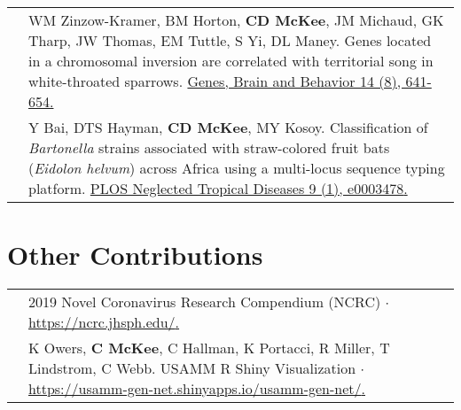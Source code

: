 \documentclass[letterpaper]{deedy-resume} %
\begin{document}
\begin{tabular}{>{\raggedright\arraybackslash}p{2cm}p{16cm}}
2015 & WM Zinzow-Kramer, BM Horton, \textbf{CD McKee}, JM Michaud, GK Tharp, JW Thomas, EM Tuttle, S Yi, DL Maney. Genes located in a chromosomal inversion are correlated with territorial song in white-throated sparrows. \href{https://doi.org/10.1111/gbb.12252}{\textcolor{special}{Genes, Brain and Behavior 14 (8), 641-654}.}\\

2015 & Y Bai, DTS Hayman, \textbf{CD McKee}, MY Kosoy. Classification of \textit{Bartonella} strains associated with straw-colored fruit bats (\textit{Eidolon helvum}) across Africa using a multi-locus sequence typing platform. \href{https://doi.org/10.1371/journal.pntd.0003478}{\textcolor{special}{PLOS Neglected Tropical Diseases 9 (1), e0003478}.}\\

\end{tabular}
\sectionspace


\section{Other Contributions}
\begin{tabular}{>{\raggedright\arraybackslash}p{2cm}p{16cm}}
2020 & 2019 Novel Coronavirus Research Compendium (NCRC) $\cdot$ \href{https://ncrc.jhsph.edu/}{\textcolor{special}{https://ncrc.jhsph.edu/}.}\\

2015 & K Owers, \textbf{C McKee}, C Hallman, K Portacci, R Miller, T Lindstrom, C Webb. USAMM R Shiny Visualization $\cdot$ \href{https://usamm-gen-net.shinyapps.io/usamm-gen-net/}{\textcolor{special}{https://usamm-gen-net.shinyapps.io/usamm-gen-net/}.}
\end{tabular}
\sectionspace

\end{document}
